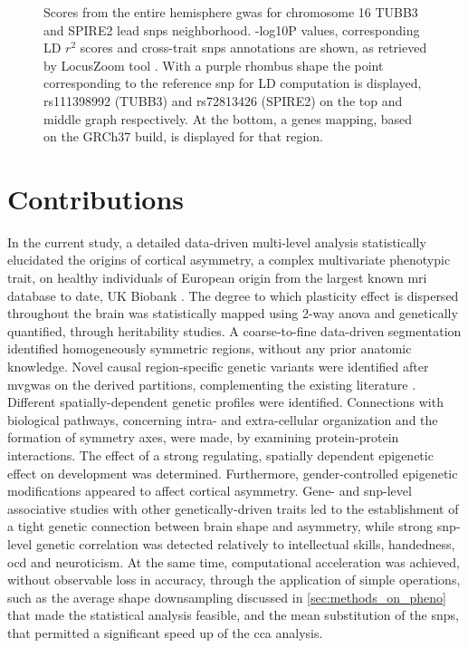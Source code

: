 \begin{figure}[H]
	\begin{adjustwidth}{-3cm}{-2.5cm}
		\centering
		\par\medskip
		\caption[Entire hemisphere \ac{gwas} Manhattan plot chromosome 16 peaks  in detail]{Scores from the entire hemisphere \ac{gwas} for chromosome 16 TUBB3 and SPIRE2 lead \acp{snp} neighborhood. -log10P values, corresponding LD $r^2$ scores and cross-trait \acp{snp} annotations are shown, as retrieved by LocusZoom tool \cite{Boughton2021}. With a purple rhombus shape the point corresponding to the reference \ac{snp} for LD computation is displayed, rs111398992 (TUBB3) and rs72813426 (SPIRE2) on the top and middle graph respectively. At the bottom, a genes mapping, based on the GRCh37 build, is displayed for that region.}
		\label{fig:chr16}
	\end{adjustwidth}
\end{figure}


\section{Contributions}
In the current study, a detailed  data-driven multi-level analysis statistically elucidated the origins of cortical asymmetry, a complex multivariate phenotypic trait, on healthy individuals of European origin from the largest known \ac{mri} database to date, UK Biobank \cite{Littlejohns2020}. The degree to which plasticity effect is dispersed throughout the brain was statistically mapped using 2-way \ac{anova} and genetically quantified, through heritability studies. A coarse-to-fine data-driven segmentation identified homogeneously symmetric regions, without any prior anatomic knowledge.  Novel causal region-specific genetic variants were identified after \ac{mvgwas} on the derived partitions, complementing the existing literature \cite{Sha2021}. Different spatially-dependent genetic profiles were identified. Connections with biological pathways, concerning intra- and extra-cellular organization and the formation of symmetry axes, were made, by examining protein-protein interactions. The effect of a strong regulating, spatially dependent epigenetic effect on development was determined. Furthermore, gender-controlled epigenetic modifications appeared to affect cortical asymmetry. Gene- and \ac{snp}-level associative studies  with other genetically-driven traits led to the establishment of a tight genetic connection between  brain shape and asymmetry, while strong \ac{snp}-level genetic correlation was detected relatively to intellectual skills, handedness, \ac{ocd} and neuroticism. At the same time, computational acceleration was achieved, without observable loss in accuracy, through the application of simple operations, such as the average shape downsampling discussed in \autoref{sec:methods_on_pheno} that made the statistical analysis feasible, and the mean substitution of the \acp{snp}, that permitted a significant speed up of the \ac{cca} analysis.

